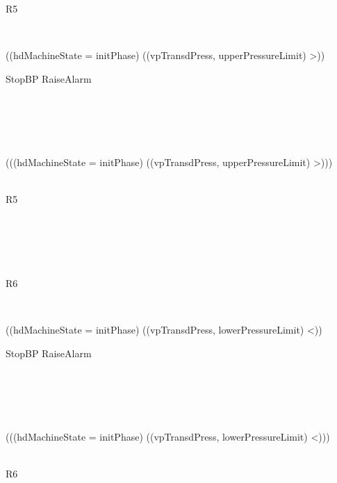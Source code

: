 \begin{circus}
	R5 \circdef \\
	\begin{block}
		\\
			\begin{block}
				\lcircguard ((hdMachineState = {initPhase}) \land ((vpTransdPress, upperPressureLimit) \in >)) \rcircguard \circguard \\
					\begin{block}
						StopBP \interleave RaiseAlarm
					\end{block}\\
					
			\end{block}\\
			 \extchoice \\
			\begin{block}
				\lcircguard \lnot (((hdMachineState = {initPhase}) \land ((vpTransdPress, upperPressureLimit) \in >))) \rcircguard \circguard \\
					\begin{block}
						\Skip\\ \circseq R5
					\end{block}\\
					
			\end{block}\\
			
	\end{block}\\
	
	R6 \circdef \\
	\begin{block}
		\\
			\begin{block}
				\lcircguard ((hdMachineState = {initPhase}) \land ((vpTransdPress, lowerPressureLimit) \in <)) \rcircguard \circguard \\
					\begin{block}
						StopBP \interleave RaiseAlarm
					\end{block}\\
					
			\end{block}\\
			 \extchoice \\
			\begin{block}
				\lcircguard \lnot (((hdMachineState = {initPhase}) \land ((vpTransdPress, lowerPressureLimit) \in <))) \rcircguard \circguard \\
					\begin{block}
						\Skip\\ \circseq R6
					\end{block}\\
					

\end{block}
\end{block}
\end{circus}
